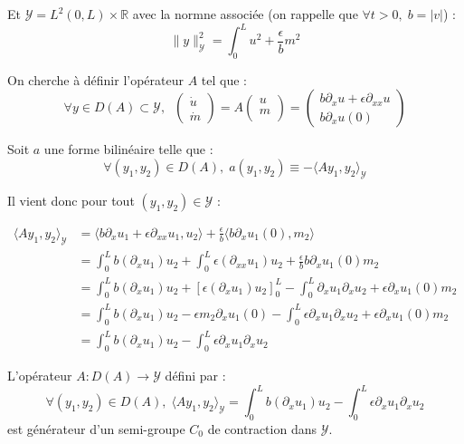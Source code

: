 \documentclass[a4paper]{article}
\newcommand{\dep}{b}
\begin{document}
 Et $\mathscr{Y} = L^2(0,L)\times \mathbb{R}$ avec la normne associée 
 (on rappelle que $\forall t>0, \;  \dep = |v|$) :
 \[\| y\|_{\mathscr{Y}}^2 = \int_0^L u^2 + \displaystyle \frac{\epsilon}{\dep} m^2 \]


On cherche à définir l'opérateur $A$ tel que :
\[ \forall y \in D(A) \subset \mathscr{Y}, \; \; 
\left( \begin{array}{c}
\dot{u}\\
\dot{m}
\end{array} \right)
= A \left( \begin{array}{c}
u\\
m\\
\end{array} \right) 
= \left(\begin{array}{c}
\dep \partial_x u + \epsilon \partial_{xx} u\\
\dep \partial_x u(0)
\end{array}\right) \]

Soit $a$ une forme bilinéaire telle que :
\[ \forall (y_1,y_2) \in D(A), \; a(y_1,y_2) \equiv - \langle A y_1,y_2\rangle_{\mathscr{Y}} \]

Il vient donc pour tout $(y_1,y_2) \in \mathscr{Y}$ :

\[
\begin{split}
	\langle A y_1,y_2\rangle_{\mathscr{Y}} & = 
	                  \langle \dep \partial_x u_1 + \epsilon \partial_{xx}u_1 ,u_2\rangle
					  + \displaystyle \frac{\epsilon}{\dep} \langle \dep \partial_x u_1(0),m_2\rangle \\	
                        &= \int_0^L \dep (\partial_xu_1)u_2
                           + \int_0^L \epsilon (\partial_{xx} u_1)u_2
                           + \displaystyle \frac{\epsilon}{\dep} \dep \partial_xu_1(0)m_2\\
						& =   \int_0^L \dep (\partial_xu_1)u_2
						   + [\epsilon (\partial_x u_1)u_2]_0^L 
						  - \int_0^L \partial_xu_1 \partial_xu_2
						   + \epsilon \partial_xu_1(0)m_2\\
						& = \int_0^L \dep (\partial_xu_1)u_2
						  -\epsilon m_2 \partial_x u_1(0) 
						 - \int_0^L \epsilon \partial_xu_1 \partial_xu_2
						   + \epsilon \partial_xu_1(0)m_2\\
   						& = \int_0^L \dep (\partial_xu_1)u_2 
   						 - \int_0^L \epsilon \partial_xu_1 \partial_xu_2
\end{split}
\]

 
\begin{proposition}
	\label{prop:cas2}
	L'opérateur $A: D(A) \to \mathscr{Y}$ défini par :
	\begin{equation} 
		\label{def:A2}
	\forall (y_1,y_2) \in D(A), \; 
	\langle A y_1,y_2\rangle_{\mathscr{Y}} =\int_0^L \dep (\partial_xu_1)u_2
                           -  \int_0^L \epsilon \partial_xu_1 \partial_xu_2
	\end{equation}
	est générateur d'un semi-groupe $C_0$ de contraction dans $\mathscr{Y}$.
\end{proposition}						
\end{document}
